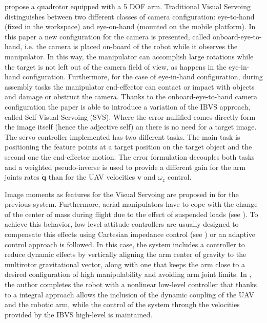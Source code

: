  
 \cite{mebarki_image-based_2014} propose a quadrotor equipped with a 5 DOF arm. Traditional Visual Servoing distinguishes between two different classes of camera configuration: eye-to-hand (fixed in the workspace) and eye-on-hand (mounted on the mobile platform). In this paper a new configuration for the camera is presented, called onboard-eye-to-hand, i.e. the camera is placed on-board of the robot while it observes the manipulator. In this way, the manipulator can accomplish large rotations while the target is not left out of the camera field of view, as happens in the eye-in-hand configuration. Furthermore, for the case of eye-in-hand configuration, during assembly tasks the manipulator end-effector can contact or impact with objects and damage or obstruct the camera. Thanks to the onboard-eye-to-hand camera configuration the paper is able to introduce a variation of the IBVS approach, called Self Visual Servoing (SVS). Where the error nullified comes directly form the image itself (hence the adjective self) an there is no need for a target image. The servo controller implemented has two different tasks. The main task is positioning the feature points at a target position on the target object and the second one the end-effector motion. The error formulation decouples both tasks and a weighted pseudo-inverse is used to provide a different gain for the arm joints rates $\bm{\dot{q}}$ than for the UAV velocities $\bm{v}$ and $\omega_z$ control.
 
 
 
Image moments as features for the Visual Servoing are proposed in \cite{mebarki_exploiting_2013} for the previous system. Furthermore, aerial manipulators have to cope with the change of the center of mass during flight due to the effect of suspended loads (see \cite{palunko_2012}). To achieve this behavior, low-level attitude controllers are usually designed to compensate this effects using Cartesian impedance control (see \cite{lippiello_impedance_2012}) or an adaptive control approach is followed. In this case, the system includes a controller to reduce dynamic effects by vertically aligning the arm center of gravity to the multirotor gravitational vector, along with one that keeps the arm close to a desired configuration of high manipulability and avoiding arm joint limits. In \cite{mebarki_cross-coupled_2014}, the author completes the robot with a nonlinear low-level controller that thanks to a integral  approach allows the inclusion of the dynamic coupling of the UAV and the robotic arm, while the control of the system through the velocities provided by the IBVS high-level is maintained.
 
